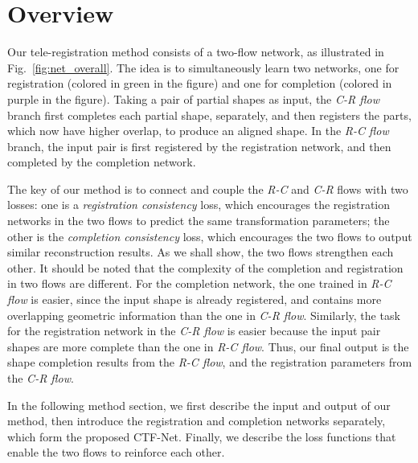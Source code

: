 
\section{Overview} \label{sec:overview}

Our tele-registration method consists of a two-flow network, as illustrated in Fig.~\ref{fig:net_overall}. The idea is to simultaneously learn two networks, one for registration (colored in green in the figure) and one for completion (colored in purple in the figure). Taking a pair of partial shapes as input, the \textit{C-R flow} branch first completes each partial shape, separately, and then registers the parts, which now have higher overlap, to produce an aligned shape. In the \textit{R-C flow} branch, the input pair is first registered by the registration network, and then completed by the completion network. %

The key of our method is to connect and couple the \textit{R-C} and \textit{C-R} flows with two losses: one is a \textit{registration consistency} loss, which encourages the registration networks in the two flows to predict the same transformation parameters; the other is the \textit{completion consistency} loss, which encourages the two flows to output similar reconstruction results.
As we shall show, the two flows strengthen each other. It should be noted that the complexity of the completion and registration in two flows are different. For the completion network, the one trained in \textit{R-C flow} is easier, since the input shape is already registered, and contains more overlapping geometric information than the one in \textit{C-R flow}. Similarly, the task for the registration network in the \textit{C-R flow} is easier because the input pair shapes are more complete than the one in \textit{R-C flow}. Thus, our final output is the shape completion results from the \textit{R-C flow}, and the registration parameters from the \textit{C-R flow}.

In the following method section, we first describe the input and output of our method, then introduce the registration and completion networks separately, which form the proposed CTF-Net. Finally, we describe the loss functions that enable the two flows to reinforce each other. 
